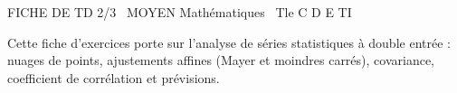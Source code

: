 \documentclass[11pt]{article}
\begin{document}
\begin{tcolorbox}[enhanced,colback=popink,colframe=popink,arc=10pt,boxrule=0pt,left=12pt,right=12pt,top=9pt,bottom=9pt]
{\color{white}\popxbold\small FICHE DE TD 2/3 \textbullet\ MOYEN \hfill Mathématiques \textbullet\ Tle C D E TI\par}
\end{tcolorbox}
\vspace{4pt}
\noindent Cette fiche d'exercices porte sur l'analyse de séries statistiques à double entrée : nuages de points, ajustements affines (Mayer et moindres carrés), covariance, coefficient de corrélation et prévisions.
\end{document}

